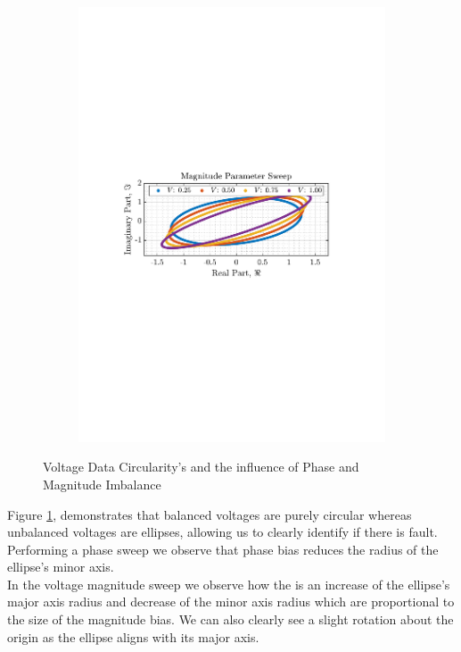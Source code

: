 \documentclass[12pt]{article}
\numberwithin{equation}{section}
\begin{document}
\begin{figure}[H]
\begin{subfigure}{0.49\textwidth}
					\includegraphics[trim={2.2cm 11.2cm 3.00cm  11.2cm}, clip, width=\textwidth]{../MATLAB/figures/q3_1c_fig04.pdf} 
					\captionsetup{justification=centering}
				\end{subfigure}
					
				\captionsetup{justification=centering}
				\caption{Voltage Data Circularity's and the influence of Phase and Magnitude Imbalance}
				\label{fig: 3-1c}
			\end{figure}
		
			Figure \ref{fig: 3-1c}, demonstrates that balanced voltages are purely circular whereas unbalanced voltages are ellipses, allowing us to clearly identify if there is fault. \\
			Performing a phase sweep we observe that phase bias reduces the radius of the ellipse's minor axis. \\
			In the voltage magnitude sweep we observe how the is an increase of the ellipse's major axis radius and decrease of the minor axis radius which are proportional to the size of the magnitude bias. We can also clearly see a slight rotation about the origin as the ellipse aligns with its major axis. 
			
\end{document}
